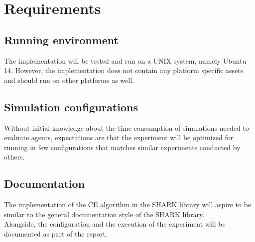 \section*{Requirements}

\subsection*{Running environment}
The implementation will be tested and run 
on a UNIX system, namely Ubuntu 14. However, 
the implementation does not contain 
any platform specific assets and should run on 
other platforms as well. 

\subsection*{Simulation configurations}
Without initial knowledge about the time consumption of simulations 
needed to evaluate agents, expectations are that the 
experiment will be optimized for running in few configurations
that matches similar experiments conducted by others.

\subsection*{Documentation}
The implementation of the CE algorithm in the SHARK 
library will aspire to be similar to the general 
documentation style of the SHARK library.\\
Alongside, the configuration and the execution of the 
experiment will be documented as part of the report.